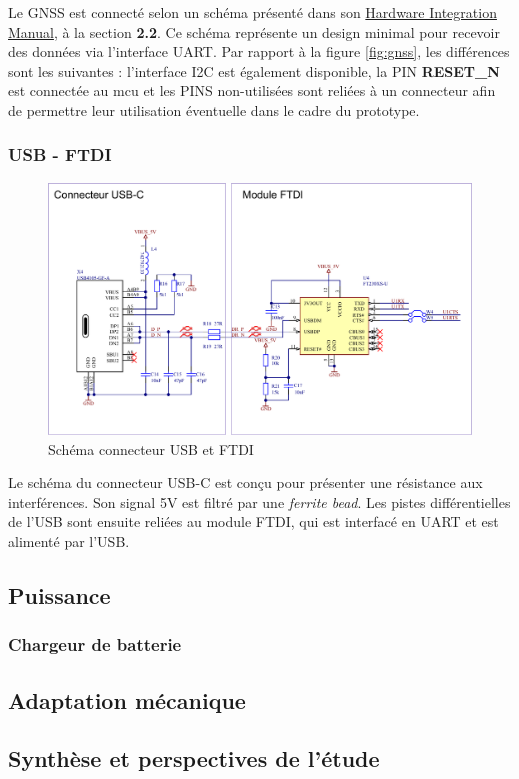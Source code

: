 Le \gls{GNSS} est connecté selon un schéma présenté dans son \href{https://www.u-blox.com/sites/default/files/CAM-M8-FW3_HIM_%28UBX-15030063%29.pdf}{Hardware Integration Manual}, à la section \textbf{2.2}. Ce schéma représente un design minimal pour recevoir des données via l'interface UART. Par rapport à la figure \ref{fig:gnss}, les différences sont les suivantes : l'interface I2C est également disponible, la PIN \textbf{RESET\_N} est connectée au \gls{mcu} et les PINS non-utilisées sont reliées à un connecteur afin de permettre leur utilisation éventuelle dans le cadre du prototype.

\subsubsection{USB - FTDI}

\begin{figure}[h]
	\centering
	\includegraphics[width=.8\linewidth]{../figures/etude/sch/USB-FTDI}
	\caption{Schéma connecteur USB et FTDI}
	\label{fig:usb-ftdi}
\end{figure}

Le schéma du connecteur USB-C est conçu pour présenter une résistance aux interférences. Son signal 5V est filtré par une \textit{ferrite bead}. Les pistes différentielles de l'USB sont ensuite reliées au module \gls{FTDI}, qui est interfacé en UART et est alimenté par l'USB.

\clearpage

\subsection{Puissance} \label{ssec:Dev-Power}

\subsubsection{Chargeur de batterie} \label{sssec:Chargeur-bat}

\subsection{Adaptation mécanique} \label{sssec:Adaptation-mech}

\subsection{Synthèse et perspectives de l'étude} \label{ssec:Synth-etude}